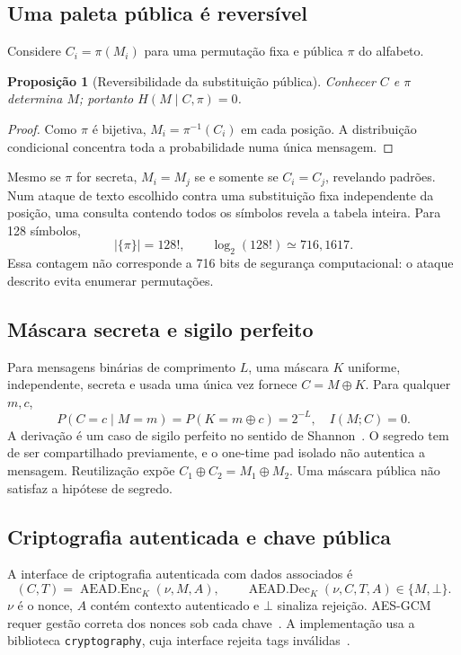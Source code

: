 \documentclass[11pt,a4paper]{article}
\newtheorem{proposition}{Proposição}
\begin{document}
\subsection{Uma paleta pública é reversível}
Considere $C_i=\pi(M_i)$ para uma permutação fixa e pública $\pi$ do alfabeto.
\begin{proposition}[Reversibilidade da substituição pública]
Conhecer $C$ e $\pi$ determina $M$; portanto $H(M\mid C,\pi)=0$.
\end{proposition}
\begin{proof}
Como $\pi$ é bijetiva, $M_i=\pi^{-1}(C_i)$ em cada posição. A distribuição condicional concentra toda a probabilidade numa única mensagem.
\end{proof}
Mesmo se $\pi$ for secreta, $M_i=M_j$ se e somente se $C_i=C_j$, revelando padrões. Num ataque de texto escolhido contra uma substituição fixa independente da posição, uma consulta contendo todos os símbolos revela a tabela inteira. Para 128 símbolos,
\begin{equation}
|\{\pi\}|=128!,\qquad\log_2(128!)\simeq716,1617.
\end{equation}
Essa contagem não corresponde a 716 bits de segurança computacional: o ataque descrito evita enumerar permutações.

\subsection{Máscara secreta e sigilo perfeito}
Para mensagens binárias de comprimento $L$, uma máscara $K$ uniforme, independente, secreta e usada uma única vez fornece $C=M\oplus K$. Para qualquer $m,c$,
\begin{equation}
P(C=c\mid M=m)=P(K=m\oplus c)=2^{-L},
\quad I(M;C)=0.
\end{equation}
A derivação é um caso de sigilo perfeito no sentido de Shannon~\cite{1949shannonSecrecy}. O segredo tem de ser compartilhado previamente, e o one-time pad isolado não autentica a mensagem. Reutilização expõe $C_1\oplus C_2=M_1\oplus M_2$. Uma máscara pública não satisfaz a hipótese de segredo.

\subsection{Criptografia autenticada e chave pública}
A interface de criptografia autenticada com dados associados é~\cite{2008mcgrewAead}
\begin{equation}
(C,T)=\operatorname{AEAD.Enc}_K(\nu,M,A),\qquad
\operatorname{AEAD.Dec}_K(\nu,C,T,A)\in\{M,\bot\}.
\end{equation}
$\nu$ é o nonce, $A$ contém contexto autenticado e $\bot$ sinaliza rejeição. AES-GCM requer gestão correta dos nonces sob cada chave~\cite{2007nistGcm}. A implementação usa a biblioteca \texttt{cryptography}, cuja interface rejeita tags inválidas~\cite{pycaAead}.
\end{document}
